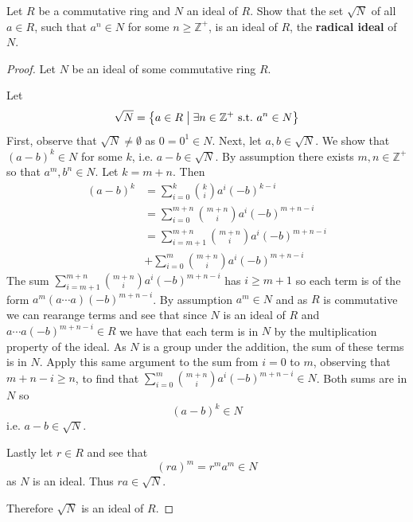 \begin{prob}
    Let $R$ be a commutative ring and $N$ an ideal of $R$. 
    Show that the set $\sqrt N$ of all $a \in R$, such that 
    $a^n \in N$ for some $n \geq \mathbb Z^+$, is an ideal of 
    $R$, the \textbf{radical ideal} of $N$.
\end{prob}
\begin{proof}
    Let $N$ be an ideal of some commutative ring $R$. 

    Let 
    \[
    \sqrt N = \left\{ a \in R \bigm| \exists n \in \mathbb Z^+ 
    \ \text{s.t.} \ a^n \in N\right\}
    \]
    First, observe that $\sqrt N \neq \emptyset$ as 
    $0 = 0^1 \in N$. Next, let $a,b \in \sqrt N$. We 
    show that $(a-b)^k \in N$ for some $k$, i.e. $a-b \in \sqrt N$. 
    By assumption there exists $m,n \in \mathbb Z^+$ so that 
    $a^m,b^n \in N$.  
    Let $k = m+n$. Then 
    \begin{align*}
        (a-b)^k 
        &= \displaystyle\sum_{i=0}^{k}\binom{k}{i}a^i(-b)^{k-i} \\ 
        &= \displaystyle\sum_{i=0}^{m+n}
        \binom{m+n}{i}a^i(-b)^{m+n-i}\\
        &=\displaystyle\sum_{i=m+1}^{m+n}
        \binom{m+n}{i}a^i(-b)^{m+n-i}\\
        &+ \displaystyle\sum_{i=0}^{m}\binom{m+n}{i}a^i(-b)^{m+n-i}
    \end{align*}
    The sum $\sum_{i=m+1}^{m+n}\binom{m+n}{i}a^i(-b)^{m+n-i}$ has 
    $i \geq m+1$ so each term is of the form $a^m(a \cdots a) 
    (-b)^{m+n-i}$. By assumption $a^m \in N$ and as 
    $R$ is commutative we can rearange terms and see that 
    since $N$ is an ideal of $R$ and $a\cdots a(-b)^{m+n-i} \in R$ 
    we have that each term is in $N$ by the multiplication property 
    of the ideal. As $N$ is a group under the addition, the sum 
    of these terms is in $N$. Apply this same argument to the 
    sum from $i=0$ to $m$, observing that $m+n - i \geq n$, to 
    find that $\sum_{i=0}^{m}\binom{m+n}{i}a^i(-b)^{m+n-i} \in N$. 
    Both sums are in $N$ so 
    \[
        (a-b)^k \in N
    \]
    i.e. $a-b \in \sqrt N$. 

    Lastly let $r \in R$ and see that 
    \[
        (ra)^m = r^ma^m \in N 
    \]
    as $N$ is an ideal. Thus $ra \in \sqrt N$.

    Therefore $\sqrt N$ is an ideal of $R$.
\end{proof}

